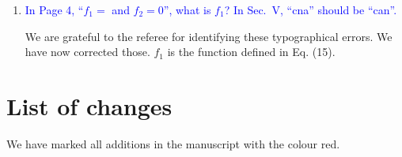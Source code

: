 \documentclass[aps,prb,onecolumn,nofootinbib,citeautoscript,10pt]{revtex4-2}
\begin{document}
\begin{enumerate}
\item \textcolor{blue}{In Page 4, ``$f_1 = $ and $f_2=0$'', what is $f_1$? In Sec.~V, ``cna'' should be ``can''.}

We are grateful to the referee for identifying these typographical errors.  We have now corrected those. $f_1 $ is the function defined in Eq. (15).

\end{enumerate}


\section{List of changes}

We have marked all additions in the manuscript with the colour red.
	

\end{document}
